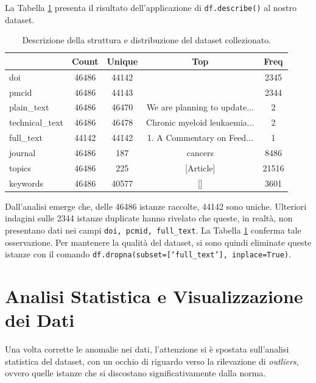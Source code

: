 \documentclass[12pt,a4paper,twoside,openright]{book}
\begin{document}
La Tabella \ref{tab:describe_ds} presenta il risultato dell'applicazione di \texttt{df.describe()} al nostro dataset.

\begin{table}[H]
\centering
\begin{tabular}{|l|c|c|c|c|}
\hline
                & Count & Unique & Top                          & Freq  \\ \hline
doi             & 46486 & 44142  &                              & 2345  \\
pmcid           & 46486 & 44143  &                              & 2344  \\
plain\_text     & 46486 & 46470  & We are planning to update... & 2     \\
technical\_text & 46486 & 46478  & Chronic myeloid leukaemia... & 2     \\
full\_text      & 44142 & 44142  & 1. A Commentary on Feed...   & 1     \\
journal         & 46486 & 187    & cancers                      & 8486  \\
topics          & 46486 & 225    & [Article]                    & 21516 \\
keywords        & 46486 & 40577  & []                           & 3601  \\ \hline
\end{tabular}
\caption{Descrizione della struttura e distribuzione del dataset collezionato.}
\label{tab:describe_ds}
\end{table}

Dall'analisi emerge che, delle 46486 istanze raccolte, 44142 sono uniche. Ulteriori indagini sulle 2344 istanze duplicate hanno rivelato che queste, in realtà, non presentano dati nei campi \texttt{doi, pcmid, full\_text}. La Tabella \ref{tab:describe_ds} conferma tale osservazione. Per mantenere la qualità del dataset, si sono quindi eliminate queste istanze con il comando \texttt{df.dropna(subset=[`full\_text'], inplace=True)}.



\section{Analisi Statistica e Visualizzazione dei Dati}
Una volta corrette le anomalie nei dati, l'attenzione si è spostata sull'analisi statistica del dataset, con un occhio di riguardo verso la rilevazione di \emph{outliers}, ovvero quelle istanze che si discostano significativamente dalla norma.
\end{document}
